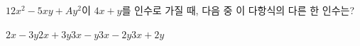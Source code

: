 $12x^2-5xy+Ay^2$이 $4x+y$를 인수로 가질 때, 다음 중 이 다항식의 다른 한 인수는? 
\begin{choices32}{$2x-3y$}{$2x+3y$}{$3x-y$}{$3x-2y$}{$3x+2y$}\end{choices32}
